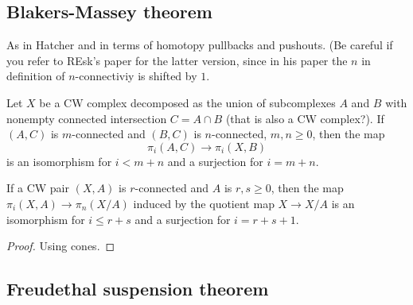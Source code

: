 \subsection{Blakers-Massey theorem}

As in Hatcher and in terms of homotopy pullbacks and pushouts. (Be careful if you refer to REsk's paper for the latter version, since in his paper the $n$ in definition of $n$-connectiviy is shifted by $1$.
\begin{thm}
	Let $X$ be a CW complex decomposed as the union of subcomplexes $A$ and $B$ with nonempty connected intersection $C=A\cap B$ {\color{magenta}(that is also a CW complex?)}. If $(A,C)$ is $m$-connected and $(B,C)$ is $n$-connected, $m,n\geq 0$, then the map
	\[\pi_{i}(A,C)\to \pi_{i}(X,B)\]
is an isomorphism for $i<m+n$ and a surjection for $i=m+n$.
\end{thm}

\begin{prop}
	If a CW pair $(X,A)$ is $r$-connected and $A$ is $r,s \geq 0$, then the map $\pi_{i}(X,A)\to \pi_{n}(X/A)$ induced by the quotient map $X\to X/A$ is an isomorphism for $i\leq r+s$ and a surjection for $i=r+s+1$.
\end{prop}
\begin{proof}
	Using cones.
\end{proof}

\subsection{Freudethal suspension theorem}

